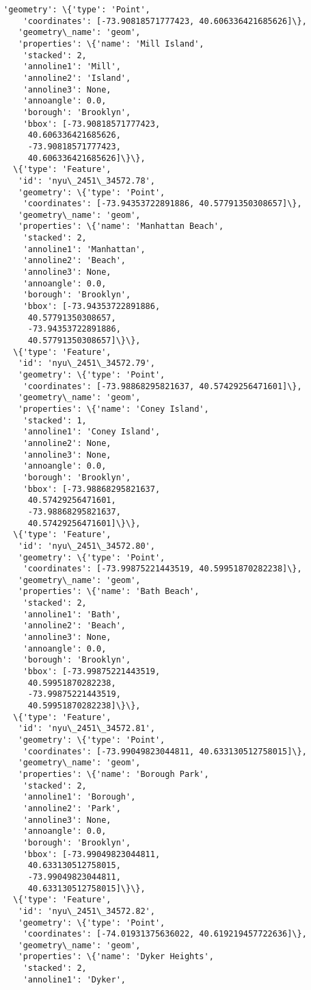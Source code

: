 \documentclass[11pt]{article}
\begin{document}
\begin{tcolorbox}[breakable, size=fbox, boxrule=.5pt, pad at break*=1mm, opacityfill=0]
\begin{Verbatim}[commandchars=\\\{\}]
   'geometry': \{'type': 'Point',
    'coordinates': [-73.90818571777423, 40.606336421685626]\},
   'geometry\_name': 'geom',
   'properties': \{'name': 'Mill Island',
    'stacked': 2,
    'annoline1': 'Mill',
    'annoline2': 'Island',
    'annoline3': None,
    'annoangle': 0.0,
    'borough': 'Brooklyn',
    'bbox': [-73.90818571777423,
     40.606336421685626,
     -73.90818571777423,
     40.606336421685626]\}\},
  \{'type': 'Feature',
   'id': 'nyu\_2451\_34572.78',
   'geometry': \{'type': 'Point',
    'coordinates': [-73.94353722891886, 40.57791350308657]\},
   'geometry\_name': 'geom',
   'properties': \{'name': 'Manhattan Beach',
    'stacked': 2,
    'annoline1': 'Manhattan',
    'annoline2': 'Beach',
    'annoline3': None,
    'annoangle': 0.0,
    'borough': 'Brooklyn',
    'bbox': [-73.94353722891886,
     40.57791350308657,
     -73.94353722891886,
     40.57791350308657]\}\},
  \{'type': 'Feature',
   'id': 'nyu\_2451\_34572.79',
   'geometry': \{'type': 'Point',
    'coordinates': [-73.98868295821637, 40.57429256471601]\},
   'geometry\_name': 'geom',
   'properties': \{'name': 'Coney Island',
    'stacked': 1,
    'annoline1': 'Coney Island',
    'annoline2': None,
    'annoline3': None,
    'annoangle': 0.0,
    'borough': 'Brooklyn',
    'bbox': [-73.98868295821637,
     40.57429256471601,
     -73.98868295821637,
     40.57429256471601]\}\},
  \{'type': 'Feature',
   'id': 'nyu\_2451\_34572.80',
   'geometry': \{'type': 'Point',
    'coordinates': [-73.99875221443519, 40.59951870282238]\},
   'geometry\_name': 'geom',
   'properties': \{'name': 'Bath Beach',
    'stacked': 2,
    'annoline1': 'Bath',
    'annoline2': 'Beach',
    'annoline3': None,
    'annoangle': 0.0,
    'borough': 'Brooklyn',
    'bbox': [-73.99875221443519,
     40.59951870282238,
     -73.99875221443519,
     40.59951870282238]\}\},
  \{'type': 'Feature',
   'id': 'nyu\_2451\_34572.81',
   'geometry': \{'type': 'Point',
    'coordinates': [-73.99049823044811, 40.633130512758015]\},
   'geometry\_name': 'geom',
   'properties': \{'name': 'Borough Park',
    'stacked': 2,
    'annoline1': 'Borough',
    'annoline2': 'Park',
    'annoline3': None,
    'annoangle': 0.0,
    'borough': 'Brooklyn',
    'bbox': [-73.99049823044811,
     40.633130512758015,
     -73.99049823044811,
     40.633130512758015]\}\},
  \{'type': 'Feature',
   'id': 'nyu\_2451\_34572.82',
   'geometry': \{'type': 'Point',
    'coordinates': [-74.01931375636022, 40.619219457722636]\},
   'geometry\_name': 'geom',
   'properties': \{'name': 'Dyker Heights',
    'stacked': 2,
    'annoline1': 'Dyker',

\end{Verbatim}
\end{tcolorbox}
\end{document}
